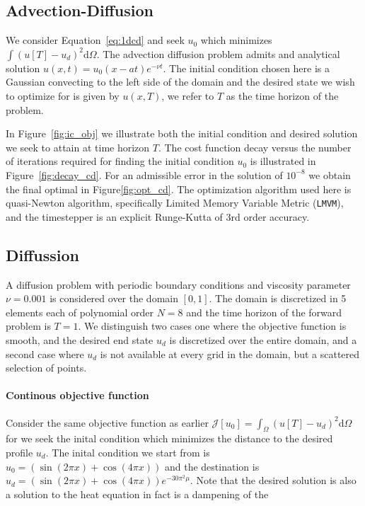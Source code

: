 \documentclass[10pt]{article}
\renewcommand{\d}{\mathrm{d}}
\begin{document}
\subsection{Advection-Diffusion}
We consider Equation~\ref{eq:1dcd} and seek $u_0$ which minimizes $\int (u[T]-u_d)^2\d \Omega$. 
The advection diffusion problem admits and analytical solution $u(x,t)=u_0(x-at)e^{-\nu t}$. The initial condition chosen here is a Gaussian convecting to the left side of the domain and the desired state we wish to optimize for is given by $u(x,T)$, we refer to $T$ as the time horizon of the problem.

In Figure~\ref{fig:ic_obj} we illustrate both the initial condition and desired solution we seek to attain at time horizon $T$. The cost function decay versus the number of iterations required for finding the initial condition $u_0$ is illustrated in Figure~\ref{fig:decay_cd}. For an admissible error in the solution of $10^{-8}$ we obtain the final optimal in Figure\ref{fig:opt_cd}. The optimization algorithm used here is quasi-Newton algorithm, specifically Limited Memory Variable Metric (\texttt{LMVM}), and the timestepper is an explicit Runge-Kutta of 3rd order accuracy.


\subsection{Diffussion}

A diffusion problem with periodic boundary conditions and viscosity parameter $\nu=0.001$ is considered over the domain $[0,1]$. The domain is discretized in 5 elements each of polynomial order $N=8$ and the time horizon of the forward problem is $T=1$. We distinguish two cases one where the objective function is smooth, and the desired end state $u_d$ is discretized over the entire domain, and a second case where $u_d$ is not available at every grid in the domain, but a scattered selection of points.


\paragraph{Continous objective function} 
Consider the same objective function as earlier 
$\mathcal J[u_0]=\int_{\Omega} (u[T]-u_d)^2 \d \Omega$ for we seek the inital condition which minimizes the distance to the desired profile $u_d$. The inital condition we start from is $u_0=(\sin(2\pi x)+\cos(4\pi x))$ and the destination is $u_d=(\sin(2\pi x)+\cos(4\pi x))e^{-30\pi^2\mu}$. Note that the desired solution is also a solution to the heat equation in fact is a dampening of the 
\end{document}
